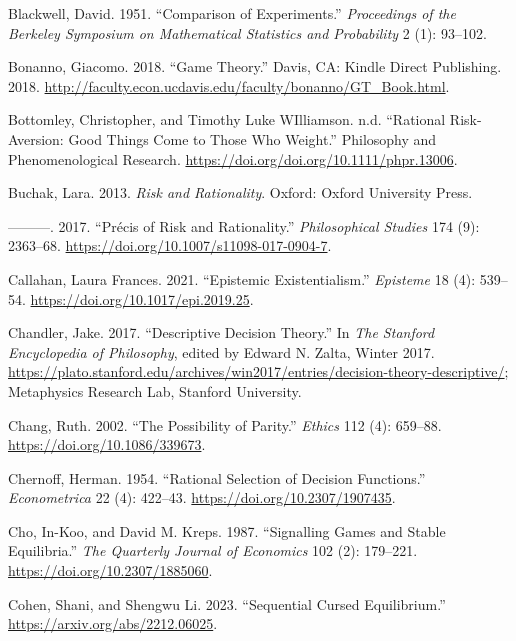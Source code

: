 \documentclass[
  12pt,
  letterpaper,
  DIV=11,
  numbers=noendperiod]{scrreprt}
\newlength{\cslhangindent}
\newenvironment{CSLReferences}[2] %
 {\begin{list}{}{%
  \setlength{\itemindent}{0pt}
  \setlength{\leftmargin}{0pt}
  \setlength{\parsep}{0pt}
  \ifodd #1
   \setlength{\leftmargin}{\cslhangindent}
   \setlength{\itemindent}{-1\cslhangindent}
  \fi
  \setlength{\itemsep}{#2\baselineskip}}}
 {\end{list}}
\begin{document}
\begin{CSLReferences}{1}{0}
Blackwell, David. 1951. {``Comparison of Experiments.''}
\emph{Proceedings of the Berkeley Symposium on Mathematical Statistics
and Probability} 2 (1): 93--102.

Bonanno, Giacomo. 2018. {``Game Theory.''} Davis, CA: Kindle Direct
Publishing. 2018.
\url{http://faculty.econ.ucdavis.edu/faculty/bonanno/GT_Book.html}.

Bottomley, Christopher, and Timothy Luke WIlliamson. n.d. {``Rational
Risk-Aversion: Good Things Come to Those Who Weight.''} {P}hilosophy and
{P}henomenological {R}esearch.
\url{https://doi.org/doi.org/10.1111/phpr.13006}.

Buchak, Lara. 2013. \emph{Risk and Rationality}. Oxford: Oxford
University Press.

---------. 2017. {``Pr{é}cis of Risk and Rationality.''}
\emph{Philosophical Studies} 174 (9): 2363--68.
\url{https://doi.org/10.1007/s11098-017-0904-7}.

Callahan, Laura Frances. 2021. {``Epistemic Existentialism.''}
\emph{Episteme} 18 (4): 539--54.
\url{https://doi.org/10.1017/epi.2019.25}.

Chandler, Jake. 2017. {``{Descriptive Decision Theory}.''} In \emph{The
{Stanford} Encyclopedia of Philosophy}, edited by Edward N. Zalta,
{W}inter 2017.
\url{https://plato.stanford.edu/archives/win2017/entries/decision-theory-descriptive/};
Metaphysics Research Lab, Stanford University.

Chang, Ruth. 2002. {``The Possibility of Parity.''} \emph{Ethics} 112
(4): 659--88. \url{https://doi.org/10.1086/339673}.

Chernoff, Herman. 1954. {``Rational Selection of Decision Functions.''}
\emph{Econometrica} 22 (4): 422--43.
\url{https://doi.org/10.2307/1907435}.

Cho, In-Koo, and David M. Kreps. 1987. {``Signalling Games and Stable
Equilibria.''} \emph{The Quarterly Journal of Economics} 102 (2):
179--221. \url{https://doi.org/10.2307/1885060}.

Cohen, Shani, and Shengwu Li. 2023. {``Sequential Cursed Equilibrium.''}
\url{https://arxiv.org/abs/2212.06025}.


\end{CSLReferences}
\end{document}
